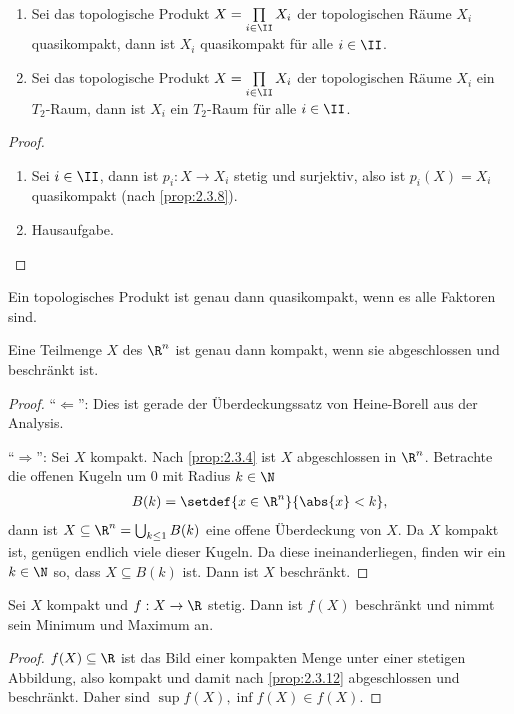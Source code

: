 \begin{cor}
\label{prop:2.3.9}
\begin{enumerate}
  \item Sei das topologische Produkt $X=\prod\limits_{i\in\II} X_i$ der
  topologischen Räume $X_i$ quasikompakt, dann ist $X_i$ quasikompakt für alle
  $i\in\II$.
  \item Sei das topologische Produkt $X=\prod\limits_{i\in\II} X_i$ der
  topologischen Räume $X_i$ ein $T_2$-Raum, dann ist $X_i$ ein $T_2$-Raum für
  alle $i\in\II$.\fishhere
\end{enumerate}
\end{cor}
\begin{proof}
\begin{enumerate}
  \item Sei $i\in\II$, dann ist $p_i: X\to X_i$ stetig und surjektiv, also ist
  $p_i(X) = X_i$ quasikompakt (nach \ref{prop:2.3.8}).
  \item Hausaufgabe.\qedhere
\end{enumerate}
\end{proof}

\begin{cor}
\label{prop:2.3.10}
Ein topologisches Produkt ist genau dann quasikompakt, wenn es alle Faktoren
sind.\fishhere
\end{cor}

\addtocounter{prop}{1}

\begin{prop}
\label{prop:2.3.12}
Eine Teilmenge $X$ des $\R^n$ ist genau dann kompakt, wenn sie abgeschlossen
und beschränkt ist.\fishhere
\end{prop}
\begin{proof}
``$\Leftarrow$'': Dies ist gerade der Überdeckungssatz von Heine-Borell aus der
Analysis.

``$\Rightarrow$'': Sei $X$ kompakt. Nach \ref{prop:2.3.4} ist $X$ abgeschlossen
in $\R^n$. Betrachte die offenen Kugeln um $0$ mit Radius $k\in\N$
\begin{align*}
B(k) = \setdef{x\in\R^n}{\abs{x}<k},
\end{align*}
dann ist $X\subseteq \R^n=\bigcup_{k\le1} B(k)$ eine offene Überdeckung von
$X$. Da $X$ kompakt ist, genügen endlich viele dieser Kugeln. Da diese
ineinanderliegen, finden wir ein $k\in\N$ so, dass $X\subseteq B(k)$ ist. Dann
ist $X$ beschränkt.\qedhere
\end{proof}

\begin{cor}
\label{prop:2.3.13}
Sei $X$ kompakt und $f:X\to\R$ stetig. Dann ist $f(X)$ beschränkt und nimmt
sein Minimum und Maximum an.\fishhere
\end{cor}
\begin{proof}
$f(X)\subseteq\R$ ist das Bild einer kompakten Menge unter einer stetigen
Abbildung, also kompakt und damit nach
\ref{prop:2.3.12} abgeschlossen und beschränkt. Daher sind $\sup f(X),\inf
f(X)\in f(X)$.\qedhere
\end{proof}

